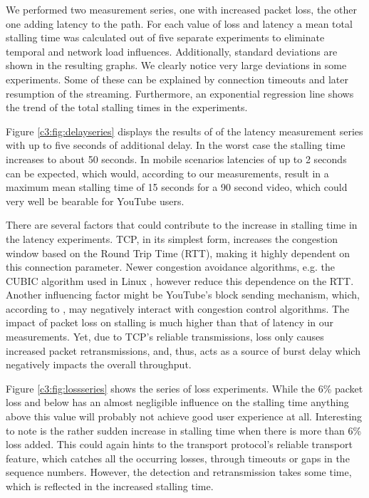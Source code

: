 We performed two measurement series, one with increased packet loss, the other one adding latency to the path. For each value of loss and latency a mean total stalling time was calculated out of five separate experiments to eliminate temporal and network load influences. Additionally, standard deviations are shown in the resulting graphs. We clearly notice very large deviations in some experiments. Some of these can be explained by connection timeouts and later resumption of the streaming. Furthermore, an exponential regression line shows the trend of the total stalling times in the experiments.


Figure \ref{c3:fig:delayseries} displays the results of of the latency measurement series with up to five seconds of additional delay. In the worst case the stalling time increases to about 50 seconds. In mobile scenarios latencies of up to 2 seconds can be expected, which would, according to our measurements, result in a maximum mean stalling time of 15 seconds for a 90 second video, which could very well be bearable for YouTube users.

There are several factors that could contribute to the increase in stalling time in the latency experiments. 
TCP, in its simplest form, increases the congestion window based on the Round Trip Time (RTT), making it highly dependent on this connection parameter. Newer congestion avoidance algorithms, e.g. the CUBIC algorithm used in Linux \cite{ha2008cubic}, however reduce this dependence on the RTT.
Another influencing factor might be YouTube's block sending mechanism, which, according to \cite{alcock2011afcyt}, may negatively interact with congestion control algorithms. The impact of packet loss on stalling is much higher than that of latency in our measurements. Yet, due to TCP's reliable transmissions, loss only causes increased packet retransmissions, and, thus, acts as a source of burst delay which negatively impacts the overall throughput.

Figure \ref{c3:fig:lossseries} shows the series of loss experiments. While the 6\% packet loss and below has an almost negligible influence on the stalling time anything above this value will probably not achieve good user experience at all. Interesting to note is the rather sudden increase in stalling time when there is more than 6\% loss added. This could again hints to the transport protocol's reliable transport feature, which catches all the occurring losses, through timeouts or gaps in the sequence numbers. However, the detection and retransmission takes some time, which is reflected in the increased stalling time.






